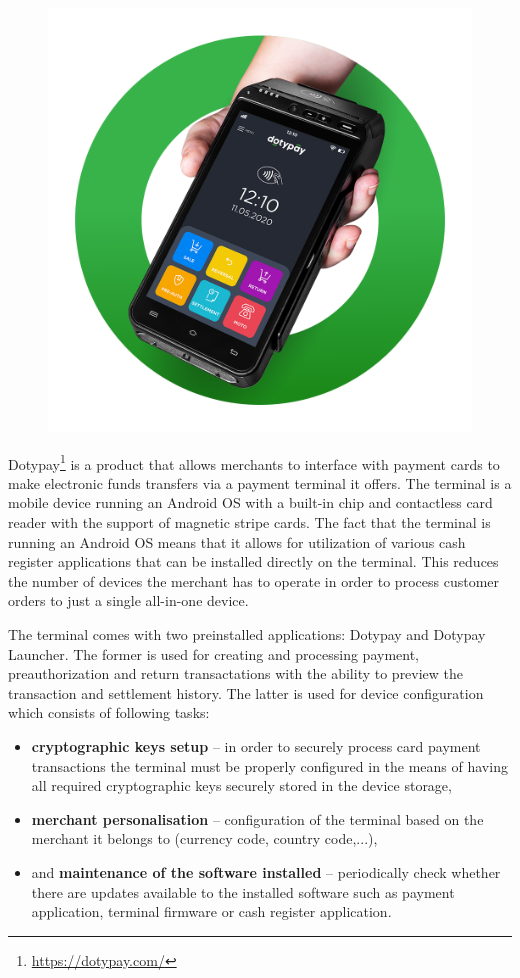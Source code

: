 \documentclass[12pt, a4paper]{article}
\begin{document}
\begin{figure}
    \centering
    \includegraphics[width=.37\textwidth]{img/dotypay-payment-terminal.png}
\end{figure}

Dotypay\footnote{\url{https://dotypay.com/}} is a product that allows merchants to interface with payment cards to make electronic funds transfers via a payment terminal it offers.
The terminal is a mobile device running an Android OS with a built-in chip and contactless card reader with the support of magnetic stripe cards.
The fact that the terminal is running an Android OS means that it allows for utilization of various cash register applications that can be installed directly on the terminal. 
This reduces the number of devices the merchant has to operate in order to process customer orders to just a single all-in-one device.

The terminal comes with two preinstalled applications: Dotypay and Dotypay Launcher. The former is used for creating and processing payment, preauthorization and return transactations with the ability to preview the transaction and settlement history. The latter is used for device configuration which consists of following tasks:

\begin{itemize}
    \item \textbf{cryptographic keys setup} -- in order to securely process card payment transactions the terminal must be properly configured in the means of having all required cryptographic keys securely stored in the device storage,
    \item \textbf{merchant personalisation} -- configuration of the terminal based on the merchant it belongs to (currency code, country code,...),
    \item and \textbf{maintenance of the software installed} -- periodically check whether there are updates available to the installed software such as payment application, terminal firmware or cash register application.

\end{itemize}
\end{document}
